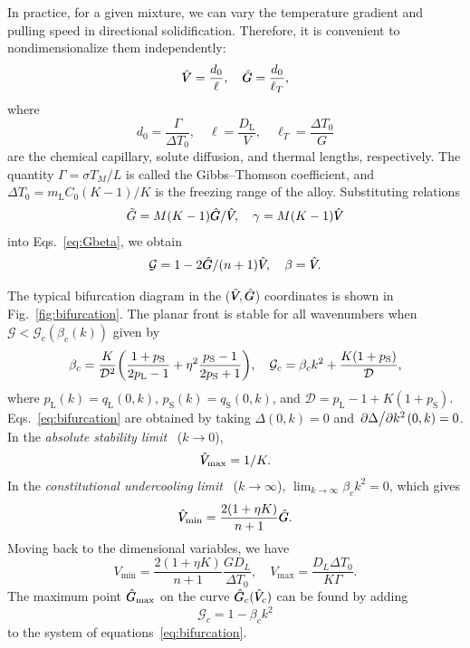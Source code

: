 \documentclass{article}
\newcommand{\liq}{\text{L}}
\newcommand{\sol}{\text{S}}
\newcommand{\qL}{q_\liq}
\newcommand{\qS}{q_\sol}
\newcommand{\pL}{p_\liq}
\newcommand{\pS}{p_\sol}
\newcommand{\hV}[1][\qty(\bar{V})]{\vphantom{#1}\mathrlap{\smash{\hat{V}}}V}
\newcommand{\hG}[1][\qty(\bar{G})]{\vphantom{#1}\mathrlap{\smash{\hat{G}}}G}
\begin{document}
In practice, for a given mixture, we can vary the temperature gradient and pulling speed in directional solidification.
Therefore, it is convenient to nondimensionalize them independently:
\begin{equation}\label{eq:hatGV}
    \hV = \frac{d_0}{\ell}, \quad \hG = \frac{d_0}{\ell_T},
\end{equation}
where
\begin{equation}\label{eq:lengths}
    d_0 = \frac{\Gamma}{\Delta{T}_0}, \quad
    \ell = \frac{D_\liq}{V}, \quad \ell_T = \frac{\Delta{T}_0}{G}
\end{equation}
are the chemical capillary, solute diffusion, and thermal lengths, respectively.
The quantity $\Gamma = \sigma T_M/L$ is called the Gibbs--Thomson coefficient,
and $\Delta{T}_0 = m_\liq C_0(K-1)/K$ is the freezing range of the alloy.
Substituting relations
\begin{equation}\label{eq:tildeGgamma}
    \tilde{G} = M(K-1)\hG/\hV, \quad \gamma = M(K-1)\hV
\end{equation}
into Eqs.~\eqref{eq:Gbeta}, we obtain
\begin{equation}\label{eq:Gbeta2}
    \mathcal{G} = 1 - 2\hG/(n+1)\hV, \quad \beta = \hV.
\end{equation}

The typical bifurcation diagram in the ($\hV,\hG$) coordinates is shown in Fig.~\ref{fig:bifurcation}.
The planar front is stable for all wavenumbers when $\mathcal{G} < \mathcal{G}_c(\beta_c(k))$ given by
\begin{equation}\label{eq:bifurcation}
    \beta_c = \frac{K}{\mathcal{D}^2}\qty(\frac{1+\pS}{2\pL-1} + \eta^2\frac{\pS-1}{2\pS+1}), \quad
    \mathcal{G}_c = \beta_c k^2 + \frac{K(1+\pS)}{\mathcal{D}},
\end{equation}
where $\pL(k)=\qL(0,k)$, $\pS(k)=\qS(0,k)$, and $\mathcal{D} = \pL-1 + K(1+\pS)$.
Eqs.~\eqref{eq:bifurcation} are obtained by taking $\Delta(0,k)=0$ and ${\pdv*{\Delta}{k^2}}(0,k)=0$.
In the \emph{absolute stability limit}~\cite{mullins1964stability} ($k\to0$),
\begin{equation}\label{eq:Vmax}
    \hV_\text{max} = 1/K.
\end{equation}
In the \emph{constitutional undercooling limit}~\cite{tiller1953redistribution} ($k\to\infty$),
$\lim_{k\to\infty}\beta_ck^2 = 0$, which gives
\begin{equation}\label{eq:Vmin}
    \hV_\text{min} = \frac{2(1+\eta K)}{n+1}\hG.
\end{equation}
Moving back to the dimensional variables, we have
\begin{equation}\label{eq:Vminmax}
    V_\text{min} = \frac{2(1+\eta K)}{n+1}\frac{GD_L}{\Delta{T}_0}, \quad
    V_\text{max} = \frac{D_L\Delta{T}_0}{K\Gamma}.
\end{equation}
The maximum point $\hG_\text{max}$ on the curve $\hG_c(\hV_c)$ can be found by adding
\begin{equation}\label{eq:Gmax}
    \mathcal{G}_c = 1 - \beta_ck^2
\end{equation}
to the system of equations~\eqref{eq:bifurcation}.
\end{document}
